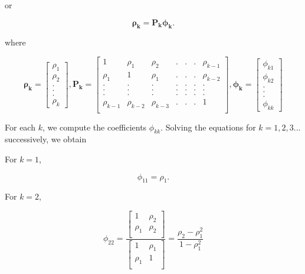 \documentclass[
  11pt,
  a4paper,
]{report}
\begin{document}
or

\[\bm{\rho_k}=\bm{P_k\phi_k}.\]

where

\[\bm{\rho_k} = \left[\begin{array}
{r}
\rho_1  \\
\rho_2  \\
.\\
.\\
.\\
\rho_k
\end{array}\right], \bm{P_k} =\left[\begin{array}
{rrrrrrr}
1 & \rho_1 & \rho_2 & .&.&.& \rho_{k-1} \\
\rho_1 & 1 & \rho_1 & .&.&.& \rho_{k-2} \\
. & . & . & .&.&.& . \\
. & . & . & .&.&.& . \\
. & . & . & .&.&.& . \\
\rho_{k-1} & \rho_{k-2} & \rho_{k-3} & .&.&.& 1 \\
\end{array}\right], \bm{\phi_k} = \left[\begin{array}
{r}
\phi_{k1}  \\
\phi_{k2}  \\
.\\
.\\
.\\
\phi_{kk}
\end{array}\right]\]

For each \(k\), we compute the coefficients \(\phi_{kk}\). Solving the
equations for \(k=1, 2, 3...\) successively, we obtain

For \(k=1\),

\begin{equation}
\phi_{11}=\rho_1.
\end{equation}

For \(k=2\),

\begin{equation}
\phi_{22}=\frac{\left[\begin{array}
{rr}
1 & \rho_2  \\
\rho_1 & \rho_2  \\
\end{array}\right]}{\left[\begin{array}
{rr}
1 & \rho_1  \\
\rho_1 & 1  \\
\end{array}\right]} = \frac{\rho_2-\rho_1^2}{1-\rho_1^2}
\end{equation}
\end{document}

